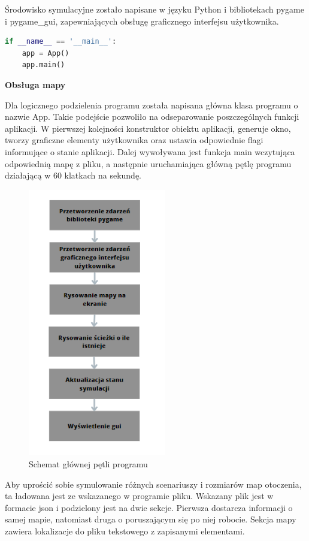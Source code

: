 Środowisko symulacyjne zostało napisane w języku Python i bibliotekach pygame\cite{dokPygame} i pygame\_gui\cite{dokPygameGui},
zapewniających obsługę graficznego interfejsu użytkownika. 
\begin{lstlisting}[language=Python,caption=Uruchomienie aplikacji,label={kodPythonStartApki}]
if __name__ == '__main__':
    app = App()
    app.main()
\end{lstlisting}

\textbf{Obsługa mapy}

Dla logicznego podzielenia programu została napisana główna klasa programu o nazwie App.
Takie podejście pozwoliło na odseparowanie poszczególnych funkcji aplikacji. 
W pierwszej kolejności konstruktor obiektu aplikacji, generuje okno, tworzy 
graficzne elementy użytkownika oraz ustawia odpowiednie flagi informujące o stanie aplikacji. 
Dalej wywoływana jest funkcja main wczytująca odpowiednią mapę z pliku, a następnie uruchamiająca 
główną pętlę programu działającą w 60 klatkach na sekundę.

\begin{figure}[H]
	\centering
	\includegraphics[width=6cm]{pages/implementacja/zdjecia/schematPetliApki.png}
	\caption{Schemat głównej pętli programu}
	\label{fig:schematPetliGlownej}
\end{figure}

Aby uprościć sobie symulowanie różnych scenariuszy i rozmiarów map otoczenia, ta ładowana jest ze wskazanego w 
programie pliku. Wskazany plik jest w formacie json i podzielony jest na dwie sekcje. 
Pierwsza dostarcza informacji o samej mapie, natomiast druga o poruszającym się po niej robocie. 
Sekcja mapy zawiera lokalizacje do pliku tekstowego z zapisanymi elementami. 

